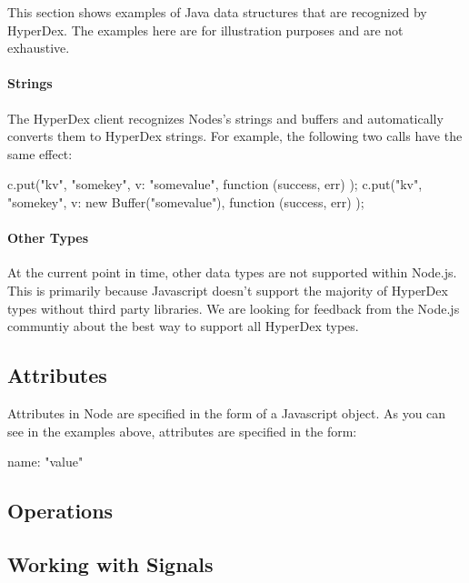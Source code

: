 This section shows examples of Java data structures that are recognized by
HyperDex.  The examples here are for illustration purposes and are not
exhaustive.

\paragraph{Strings}

The HyperDex client recognizes Nodes's strings and buffers and automatically
converts them to HyperDex strings.  For example, the following two calls
have the same effect:

\begin{javascriptcode}
c.put("kv", "somekey", {v: "somevalue"}, function (success, err) {});
c.put("kv", "somekey", {v: new Buffer("somevalue")}, function (success, err) {});
\end{javascriptcode}

\paragraph{Other Types}

At the current point in time, other data types are not supported within Node.js.
This is primarily because Javascript doesn't support the majority of HyperDex
types without third party libraries.  We are looking for feedback from the
Node.js communtiy about the best way to support all HyperDex types.

\subsection{Attributes}
\label{sec:api:node:attributes}

Attributes in Node are specified in the form of a Javascript object.  As you can
see in the examples above, attributes are specified in the form:

\begin{javascriptcode}
{name: "value"}
\end{javascriptcode}

\subsection{Operations}
\label{sec:api:node:ops}



\subsection{Working with Signals}
\label{sec:api:node:signals}

